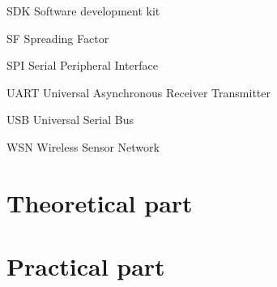 \documentclass[oneside]{ctuthesis}
\theoremstyle{plain}
\theoremstyle{definition}
\theoremstyle{note}
\newcommand{\abbrlabel}[1]{\makebox[3cm][l]{\textbf{#1}\ \dotfill}}
\newenvironment{abbreviations}{\begin{list}{}{\renewcommand{\makelabel}{\abbrlabel}}}{\end{list}}
\begin{document}
\begin{abbreviations}
	\item[SDK]	 	Software development kit
	\item[SF]		Spreading Factor
	\item[SPI]   	Serial Peripheral Interface 
	\item[UART]		Universal Asynchronous Receiver Transmitter 
	\item[USB]		Universal Serial Bus 
	\item[WSN]		Wireless Sensor Network

\end{abbreviations}



\part{Theoretical part}
									



\part{Practical part}








\end{document}
